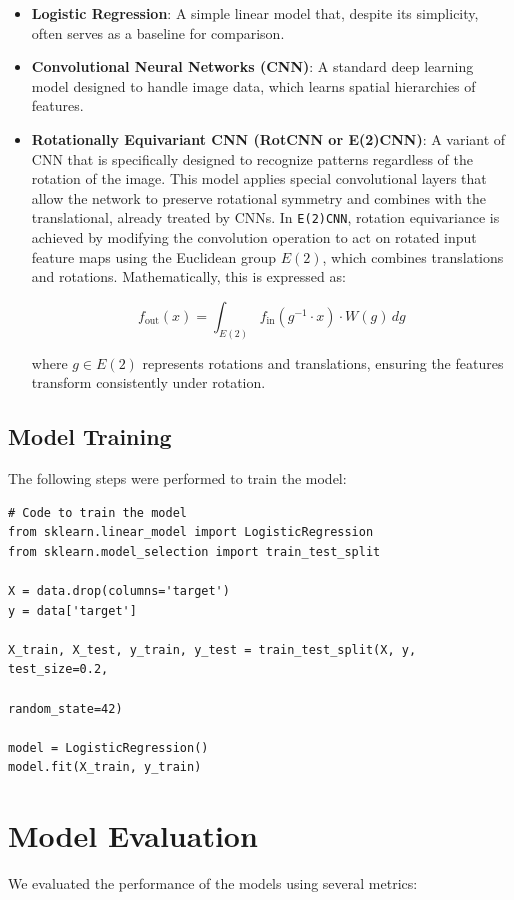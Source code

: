 \documentclass[12pt]{article}
\begin{document}
\begin{itemize}
    \item \textbf{Logistic Regression}: A simple linear model that, despite its simplicity, often serves as a baseline for comparison.
    \item \textbf{Convolutional Neural Networks (CNN)}: A standard deep learning model designed to handle image data, which learns spatial hierarchies of features.
    \item \textbf{Rotationally Equivariant CNN (RotCNN or E(2)CNN)}: A variant of CNN that is specifically designed to recognize patterns regardless of the rotation of the image. This model applies special convolutional layers that allow the network to preserve rotational symmetry and combines with the translational, already treated by CNNs. In \texttt{E(2)CNN}, rotation equivariance is achieved by modifying the convolution operation to act on rotated input feature maps using the Euclidean group \( E(2) \), which combines translations and rotations. Mathematically, this is expressed as:

\[
f_{\text{out}}(x) = \int_{E(2)} f_{\text{in}}(g^{-1} \cdot x) \cdot W(g) \, dg
\]

where \( g \in E(2) \) represents rotations and translations, ensuring the features transform consistently under rotation.
\end{itemize}

\subsection{Model Training}
The following steps were performed to train the model:

\begin{verbatim}
# Code to train the model
from sklearn.linear_model import LogisticRegression
from sklearn.model_selection import train_test_split

X = data.drop(columns='target')
y = data['target']

X_train, X_test, y_train, y_test = train_test_split(X, y, test_size=0.2, 
														random_state=42)

model = LogisticRegression()
model.fit(X_train, y_train)
\end{verbatim}

\section{Model Evaluation}
We evaluated the performance of the models using several metrics:
\end{document}
